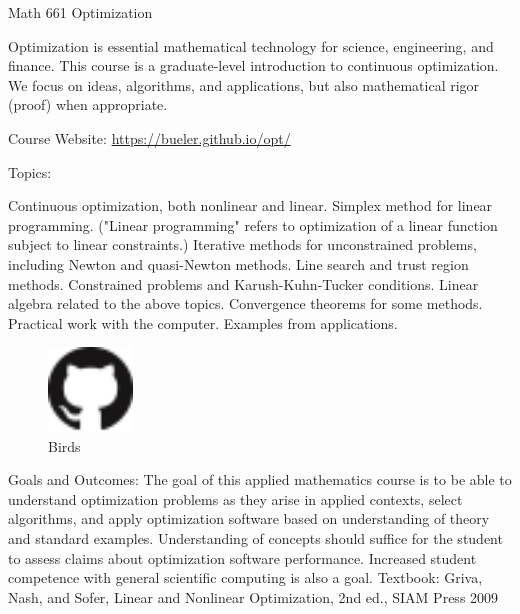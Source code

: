 \documentclass[12pt]{amsart}
\begin{document}
\begin{center}
\LARGE Math 661 Optimization
\end{center}

\thispagestyle{empty}

Optimization is essential mathematical technology for science, engineering, and finance. This course is a graduate-level introduction to continuous optimization.  We focus on ideas, algorithms, and applications, but also mathematical rigor (proof) when appropriate.

Course Website: \url{https://bueler.github.io/opt/}

Topics:

    Continuous optimization, both nonlinear and linear.
    Simplex method for linear programming. ("Linear programming" refers to optimization of a linear function subject to linear constraints.)
    Iterative methods for unconstrained problems, including Newton and quasi-Newton methods.
    Line search and trust region methods.
    Constrained problems and Karush-Kuhn-Tucker conditions.
    Linear algebra related to the above topics.
    Convergence theorems for some methods.
    Practical work with the computer. Examples from applications.


\begin{figure}
  \centering
    \includegraphics[width=0.2\textwidth]{../images/GitHub-Mark-32px.png}
\captionsetup{margin=1.2cm}
  \caption{Birds}
\end{figure}

Goals and Outcomes:
The goal of this applied mathematics course is to be able to understand optimization problems as they arise in applied contexts, select algorithms, and apply optimization software based on understanding of theory and standard examples. Understanding of concepts should suffice for the student to assess claims about optimization software performance. Increased student competence with general scientific computing is also a goal.
Textbook:
Griva, Nash, and Sofer, Linear and Nonlinear Optimization, 2nd ed., SIAM Press 2009 
\end{document}
